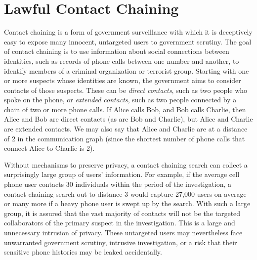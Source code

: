 \section{Lawful Contact Chaining}\label{sec-chaining}
Contact chaining is a form of government surveillance with which it is deceptively easy to expose many innocent, untargeted users to government scrutiny. The goal of contact chaining is to use information about social connections between identities, such as records of phone calls between one number and another, to identify members of a criminal organization or terrorist group. Starting with one or more suspects whose identities are known, the government aims to consider contacts of those suspects. These can be \emph{direct contacts}, such as two people who spoke on the phone, or \emph{extended contacts}, such as two people connected by a chain of two or more phone calls. If Alice calls Bob, and Bob calls Charlie, then Alice and Bob are direct contacts (as are Bob and Charlie), but Alice and Charlie are extended contacts. We may also say that Alice and Charlie are at a distance of 2 in the communication graph (since the shortest number of phone calls that connect Alice to Charlie is 2).



Without mechanisms to preserve privacy, a contact chaining search can collect a surprisingly large group of users' information. For example, if the average cell phone user contacts 30 individuals within the period of the investigation, a contact chaining search out to distance 3 would capture 27,000 users on average - or many more if a heavy phone user is swept up by the search. With such a large group, it is assured that the vast majority of contacts will not be the targeted collaborators of the primary suspect in the investigation. This is a large and unnecessary intrusion of privacy. These untargeted users may nevertheless face unwarranted government scrutiny, intrusive investigation, or a risk that their sensitive phone histories may be leaked accidentally.



